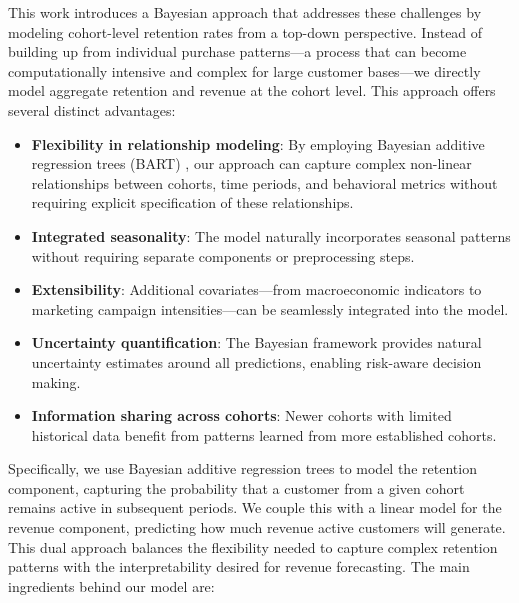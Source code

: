 \documentclass[11pt]{amsart}
\theoremstyle{definition}
\begin{document}
This work introduces a Bayesian approach that addresses these challenges by modeling cohort-level retention rates from a
top-down perspective. Instead of building up from individual purchase patterns—a process that can become computationally
intensive and complex for large customer bases—we directly model aggregate retention and revenue at the cohort level.
This approach offers several distinct advantages:

\begin{itemize}
    \item \textbf{Flexibility in relationship modeling}: By employing Bayesian additive regression trees (BART)
          \cite{quiroga2022bart}, our approach can capture complex non-linear relationships between cohorts, time periods,
          and behavioral metrics without requiring explicit specification of these relationships.

    \item \textbf{Integrated seasonality}: The model naturally incorporates seasonal patterns without requiring separate
          components or preprocessing steps.

    \item \textbf{Extensibility}: Additional covariates—from macroeconomic indicators to marketing campaign intensities—can
          be seamlessly integrated into the model.

    \item \textbf{Uncertainty quantification}: The Bayesian framework provides natural uncertainty estimates around all
          predictions, enabling risk-aware decision making.

    \item \textbf{Information sharing across cohorts}: Newer cohorts with limited historical data benefit from patterns
          learned from more established cohorts.
\end{itemize}

Specifically, we use Bayesian additive regression trees to model the retention component, capturing the probability that a
customer from a given cohort remains active in subsequent periods. We couple this with a linear model for the revenue
component, predicting how much revenue active customers will generate. This dual approach balances the flexibility needed to
capture complex retention patterns with the interpretability desired for revenue forecasting. The main ingredients behind our
model are:
\end{document}
